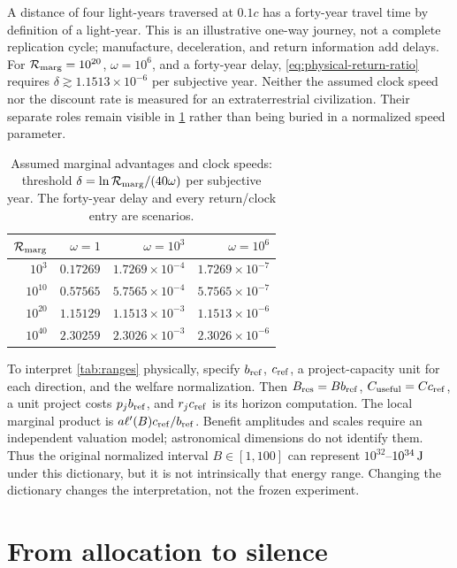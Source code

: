 A distance of four light-years traversed at $0.1c$ has a forty-year
travel time by definition of a light-year. This is an illustrative
one-way journey, not a complete replication cycle; manufacture,
deceleration, and return information add delays. For
$\mathcal R_{\rm marg}=10^{20}$, $\omega=10^6$, and a forty-year delay,
\cref{eq:physical-return-ratio} requires
$\delta\gtrsim1.1513\times10^{-6}$ per subjective year.
Neither the assumed clock speed nor the discount rate is measured for
an extraterrestrial civilization. Their separate roles remain visible
in \cref{tab:latency-sensitivity} rather than being buried in a normalized
speed parameter.
\begin{table}[tbp]
\centering
\caption{Assumed marginal advantages and clock speeds: threshold
$\delta=\ln\mathcal R_{\rm marg}/(40\omega)$ per subjective year.
The forty-year delay and every return/clock entry are scenarios.}
\label{tab:latency-sensitivity}
\begin{tabular}{@{}rrrr@{}}\toprule
$\mathcal R_{\rm marg}$ & $\omega=1$ & $\omega=10^3$ & $\omega=10^6$\\\midrule
$10^3$ & $0.17269$ & $1.7269\times10^{-4}$ & $1.7269\times10^{-7}$\\
$10^{10}$ & $0.57565$ & $5.7565\times10^{-4}$ & $5.7565\times10^{-7}$\\
$10^{20}$ & $1.15129$ & $1.1513\times10^{-3}$ & $1.1513\times10^{-6}$\\
$10^{40}$ & $2.30259$ & $2.3026\times10^{-3}$ & $2.3026\times10^{-6}$\\\bottomrule
\end{tabular}
\end{table}

To interpret \cref{tab:ranges} physically, specify $b_{\rm ref}$,
$c_{\rm ref}$, a project-capacity unit for each direction, and the welfare
normalization. Then $B_{\rm res}=Bb_{\rm ref}$,
$C_{\rm useful}=Cc_{\rm ref}$, a unit project costs $p_jb_{\rm ref}$,
and $r_jc_{\rm ref}$ is its horizon computation. The local marginal
product is $a\ell'(B)c_{\rm ref}/b_{\rm ref}$. Benefit amplitudes and
scales require an independent valuation model; astronomical dimensions
do not identify them. Thus the original normalized interval $B\in[1,100]$
can represent $10^{32}$--$10^{34}\,{\rm J}$ under this dictionary, but
it is not intrinsically that energy range. Changing the dictionary
changes the interpretation, not the frozen experiment.

\section{From allocation to silence}
\label{sec:population}
